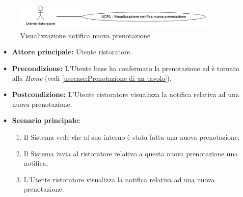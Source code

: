 \label{usecase:Visualizzazione notifica nuova prenotazione}

\begin{figure}[h]
	\centering
	\includegraphics[width=0.9\textwidth]{./uml/UCR1.png} 
	\caption{Visualizzazione notifica nuova prenotazione}
	\label{fig:UCR1}
  \end{figure}

\begin{itemize}
	\item \textbf{Attore principale:} Utente ristoratore.
	
	\item \textbf{Precondizione:} L'Utente base ha confermato la prenotazione ed è tornato alla \textit{Home} (vedi \autoref{usecase:Prenotazione di un tavolo}).

	\item \textbf{Postcondizione:} L'Utente ristoratore visualizza la notifica relativa ad una nuova prenotazione.
     
	\item \textbf{Scenario principale:}
	      \begin{enumerate}
                \item Il Sistema vede che al suo interno è stata fatta una nuova prenotazione;
                \item Il Sistema invia al ristoratore relativo a questa nuova prenotazione una notifica;
                \item L'Utente ristoratore visualizza la notifica relativa ad una nuova prenotazione.
	      \end{enumerate}
\end{itemize}